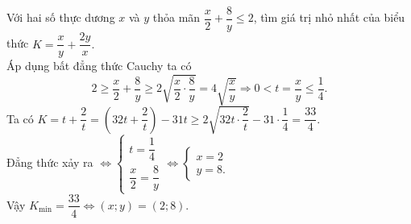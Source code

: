 \begin{ex}%
Với hai số thực dương $x$ và $y$ thỏa mãn $\dfrac{x}{2}+\dfrac{8}{y}\le 2$, tìm giá trị nhỏ nhất của biểu thức $K=\dfrac{x}{y}+\dfrac{2y}{x}.$
	\loigiai
	{\text{}\\
Áp dụng bất đẳng thức Cauchy ta có $$2\ge \dfrac{x}{2}+\dfrac{8}{y}\ge 2\sqrt{\dfrac{x}{2}\cdot\dfrac{8}{y}}=4\sqrt{\dfrac{x}{y}}\Rightarrow 0<t=\dfrac{x}{y}\le \dfrac{1}{4}.$$
Ta có $K=t+\dfrac{2}{t}=\left(32t+\dfrac{2}{t}\right)-31t\ge 2\sqrt{32t\cdot\dfrac{2}{t}}-31\cdot\dfrac{1}{4}=\dfrac{33}{4}$.\\
Đẳng thức xảy ra $\Leftrightarrow \begin{cases}t=\dfrac{1}{4}\\ \dfrac{x}{2}=\dfrac{8}{y}\end{cases}\Leftrightarrow \begin{cases}x=2\\ y=8.\end{cases}$\\
Vậy $K_{\min}=\dfrac{33}{4}\Leftrightarrow (x;y)=(2;8)$.	
}
\end{ex}
 



